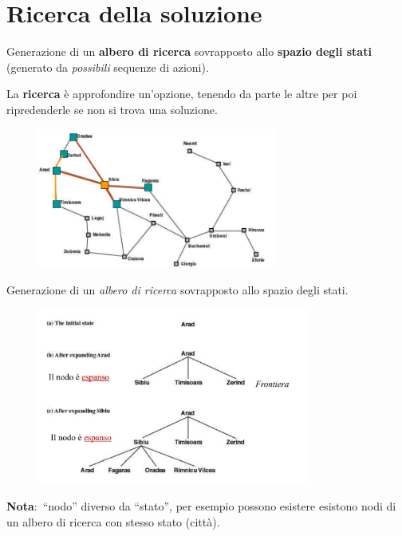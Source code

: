 \section{Ricerca della soluzione}
Generazione di un \textbf{albero di ricerca} sovrapposto allo \textbf{spazio degli stati} (generato da \textit{possibili} sequenze di azioni).

La \textbf{ricerca} è approfondire un'opzione, tenendo da parte le altre per poi ripredenderle se non si trova una soluzione.
\begin{figure}[H]
	\centering
	\includegraphics[width=0.7\textwidth]{immagini/albero_ricerca.png}
\end{figure}

Generazione di un \textit{albero di ricerca} sovrapposto allo spazio degli stati.

\begin{figure}[H]
	\centering
	\includegraphics[width=0.8\textwidth]{immagini/generazione_albero_ricerca.jpg}
\end{figure}

\noindent\textbf{Nota}:\ ``nodo'' diverso da ``stato'', per esempio possono esistere esistono nodi di un albero di ricerca con stesso stato (città).


